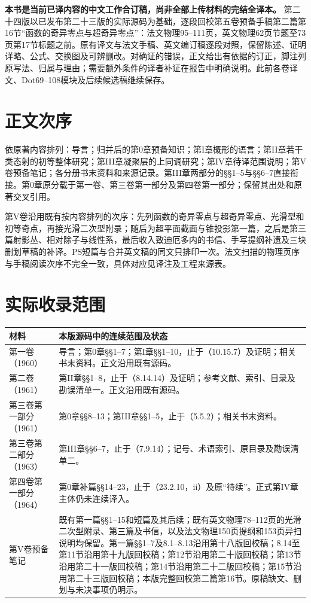 \maketitle
{}
\noindent\textbf{本书是当前已译内容的中文工作合订稿，尚非全部上传材料的完结全译本。}
第二十四版以已发布第二十三版的实际源码为基础，逐段回校第五卷预备手稿第二篇第16节“函数的奇异零点与超奇异零点”：法文物理95--111页，英文物理62页节题至73页第17节标题之前。原有译文与法文手稿、英文编订稿逐段对照，保留陈述、证明详略、公式、交换图及可辨删改。对确证的错误，正文给出有依据的订正，脚注列原写法、归属与理由；需要额外条件的译者补证在报告中明确说明。此前各卷译文、Dot69--108模块及后续候选稿继续保存。

\section*{正文次序}
依原著内容排列：导言；归并后的第0章预备知识；第I章概形的语言；第II章若干类态射的初等整体研究；第III章凝聚层的上同调研究；第IV章待译范围说明；第V卷预备笔记；各分册书末资料和来源记录。第III章两部分的§§1--5与§§6--7直接衔接。第0章原分载于第一卷、第三卷第一部分及第四卷第一部分；保留其出处和原著交叉引用。

第V卷沿用既有按内容排列的次序：先列函数的奇异零点与超奇异零点、光滑型和初等奇点，再接光滑二次型附录；随后为超平面截面与锥投影第一篇，之后是第三篇射影丛、相对除子与线性系，最后收入致迪厄多内的书信、手写提纲补遗及三块删划草稿的补译。PS短篇与合并英文稿的同文只排印一次。法文扫描的物理页序与手稿阅读次序不完全一致，具体对应见译注及工程来源表。

\clearpage
\section*{实际收录范围}
\begin{longtable}{@{}p{.25\linewidth}p{.67\linewidth}@{}}
\toprule 材料&本版源码中的连续范围及状态\\\midrule\endhead
第一卷（1960）&导言；第0章§§1--7；第I章§§1--10，止于（10.15.7）及证明；相关书末资料。正文沿用既有源码。\\
第二卷（1961）&第II章§§1--8，止于（8.14.14）及证明；参考文献、索引、目录及勘误清单一。正文沿用既有源码。\\
第三卷第一部分（1961）&第0章§§8--13；第III章§§1--5，止于（5.5.2）；相关书末资料。\\
第三卷第二部分（1963）&第III章§§6--7，止于（7.9.14）；记号、术语索引、原目录及勘误清单二。\\
第四卷第一部分（1964）&第0章补篇§§14--23，止于（23.2.10，ii）及原“待续”。正式第IV章主体仍未连续译入。\\
第V卷预备笔记&既有第一篇§§1--15和短篇及其后续；既有英文物理78--112页的光滑二次型附录、第三篇及书信，以及法文物理150页提纲和153页异扫说明均保留。第一篇§§1--7及8.1--8.13沿用第十八版回校稿；8.14至第11节沿用第十九版回校稿；第12节沿用第二十版回校稿；第13节沿用第二十一版回校稿；第14节沿用第二十二版回校稿；第15节沿用第二十三版回校稿；本版完整回校第二篇第16节。原稿缺文、删划与未决事项仍明示。\\
\bottomrule
\end{longtable}

